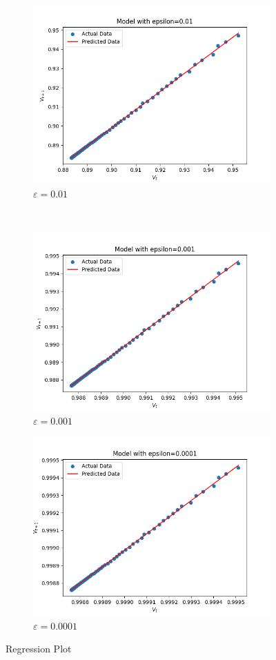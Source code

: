 \begin{figure}[h!]
        \begin{subfigure}[b]{0.3\textwidth}
            \includegraphics[width=.8\linewidth]{plots/epsilon_0.01}
            \caption{$\varepsilon = 0.01$}
        \end{subfigure}\\
        \begin{subfigure}[b]{0.3\textwidth}
            \includegraphics[width=.8\linewidth]{plots/epsilon_0.001}
            \caption{$\varepsilon = 0.001$}
        \end{subfigure} \quad
        \begin{subfigure}[b]{0.3\textwidth}
            \includegraphics[width=.8\linewidth]{plots/epsilon_0.0001}
            \caption{$\varepsilon = 0.0001$}
        \end{subfigure}
        \caption{Regression Plot}
    \end{figure}

